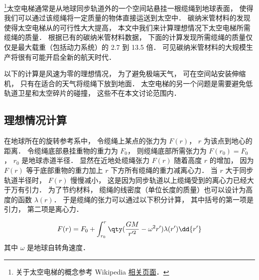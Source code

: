 

\footnote{关于太空电梯的概念参考 Wikipedia \href{https://en.wikipedia.org/wiki/Space_elevator}{相关页面}．}太空电梯通常是从地球同步轨道外的一个空间站悬挂一根缆绳到地球表面， 使得我们可以通过该缆绳将一定质量的物体直接运送到太空中． 碳纳米管材料的发现使得太空电梯从的可行性大大提高， 本文中我们来计算理想情况下太空电梯所需缆绳的质量． 根据已有的碳纳米管材料数据， 下面的计算发现所需缆绳的质量仅仅是最大载重（包括动力系统）的 2.7 到 13.5 倍． 可见碳纳米管材料的大规模生产将很有可能开启全新的航天时代．

以下的计算是风速为零的理想情况， 为了避免极端天气， 可在空间站安装伸缩机， 只有在适合的天气将缆绳下放到地面． 太空电梯的另一个问题是需要避免低轨道卫星和太空碎片的碰撞， 这些不在本文讨论范围内．

\subsection{理想情况计算}
在地球所在的旋转参考系中， 令缆绳上某点的张力为 $F(r)$， $r$ 为该点到地心的距离． 令缆绳底部悬挂重物的重力为 $F_0$， 则缆绳底部所需张力为 $F(r_0) = F_0$， $r_0$ 是地球赤道半径． 显然在近地处缆绳张力 $F(r)$ 随着高度 $r$ 的增加， 因为 $F(r)$ 等于底部重物的重力加上 $r$ 下方所有缆绳的重力减离心力． 当 $r$ 大于同步轨道半径时， $F(r)$ 慢慢减小， 这是因为同步轨道以上缆绳受到的离心力已经大于万有引力． 为了节约材料， 缆绳的线密度（单位长度的质量）也可以设计为高度的函数 $\lambda(r)$． 于是缆绳的张力可以通过以下积分计算， 其中括号的第一项是引力， 第二项是离心力．

\begin{equation}\label{SpcLad_eq1}
F(r) = F_0 + \int_{r_0}^{r} \qty(\frac{GM}{r'^2} - \omega^2 r') \lambda(r') \dd{r'}
\end{equation}
其中 $\omega$ 是地球自转角速度．

